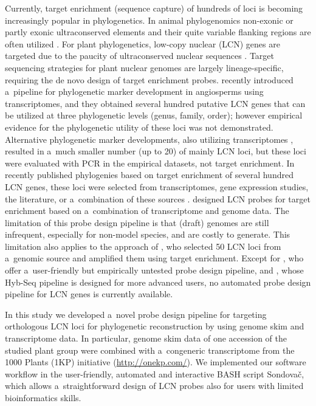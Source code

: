 \documentclass[a4paper, 11pt, twoside]{article}
\begin{document}
Currently, target enrichment (sequence capture) of hundreds of loci is becoming increasingly popular in phylogenetics. In animal phylogenomics non-exonic or partly exonic ultraconserved elements and their quite variable flanking regions are often utilized \citep[e.g.][]{Faircloth2012, Hedtke2013, Smith2014}. For plant phylogenetics, low-copy nuclear (LCN) genes are targeted \citep{Mandel2014, Weitemier2014, Grover2015, Heyduk2015, Mandel2015, Nicholls2015, Stephens2015a, Stephens2015} due to the paucity of ultraconserved nuclear sequences \citep{Reneker2012}. Target sequencing strategies for plant nuclear genomes are largely lineage-specific, requiring the de novo design of target enrichment probes. \citet{Chamala2015a} recently introduced a~pipeline for phylogenetic marker development in angiosperms using transcriptomes, and they obtained several hundred putative LCN genes that can be utilized at three phylogenetic levels (genus, family, order); however empirical evidence for the phylogenetic utility of these loci was not demonstrated. Alternative phylogenetic marker developments, also utilizing transcriptomes \citep{Pillon2014, Rothfels2013, Tonnabel2014}, resulted in a~much smaller number (up to 20) of mainly LCN loci, but these loci were evaluated with PCR in the empirical datasets, not target enrichment. In recently published phylogenies based on target enrichment of several hundred LCN genes, these loci were selected from transcriptomes, gene expression studies, the literature, or a~combination of these sources \citep{Mandel2014, Grover2015, Heyduk2015, Mandel2015, Nicholls2015, Stephens2015a, Stephens2015}. \citet{Weitemier2014} designed LCN probes for target enrichment based on a~combination of transcriptome and genome data. The limitation of this probe design pipeline is that (draft) genomes are still infrequent, especially for non-model species, and are costly to generate. This limitation also applies to the approach of \citet{DeSousa2014}, who selected 50 LCN loci from a~genomic source and amplified them using target enrichment. Except for \citet{Chamala2015a}, who offer a~user-friendly but empirically untested probe design pipeline, and \citet{Weitemier2014}, whose Hyb-Seq pipeline is designed for more advanced users, no automated probe design pipeline for LCN genes is currently available.

In this study \citep{Schmickl2016} we developed a~novel probe design pipeline for targeting orthologous LCN loci for phylogenetic reconstruction by using genome skim and transcriptome data. In particular, genome skim data of one accession of the studied plant group were combined with a~congeneric transcriptome from the 1000 Plants (1KP) initiative (\url{http://onekp.com/}). We implemented our software workflow in the user-friendly, automated and interactive BASH script Sondovač, which allows a~straightforward design of LCN probes also for users with limited bioinformatics skills.
\end{document}
